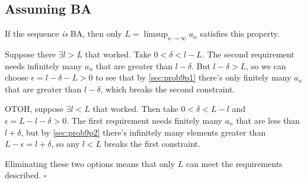 \documentclass[12pt]{article}
\begin{document}
\subsection{Assuming BA}

If the sequence \textit{is} BA, then only $L=\limsup_{n \to \infty} a_n$ satisfies this property.

Suppose there $\exists l > L$ that worked.
Take $0 < \delta < l-L$.
The second requirement needs infinitely many $a_n$ that are greater than $l-\delta$.
But $l-\delta > L$, so we can choose $\epsilon=l-\delta-L > 0$
to see that by \ref{sec:prob9p1} there's only finitely many $a_n$ that are greater than $l-\delta$,
which breaks the second constraint.

OTOH, suppose $\exists l < L$ that worked.
Then take $0 < \delta < L-l$ and $\epsilon = L-l-\delta > 0$.
The first requirement needs finitely many $a_n$ that are less than $l+\delta$,
but by \ref{sec:prob9p2} there's infinitely many elements greater than $L-\epsilon = l+\delta$,
so any $l < L$ breaks the first constraint.

Eliminating these two options means that only $L$ can meet the requirements described. $\square$
\end{document}
